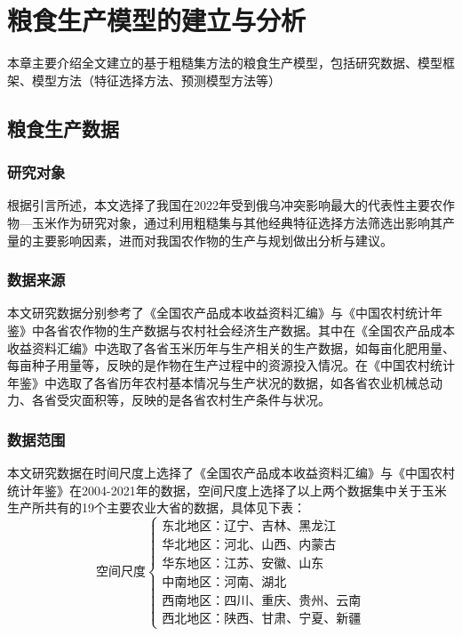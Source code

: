 
\chapter{粮食生产模型的建立与分析}

本章主要介绍全文建立的基于粗糙集方法的粮食生产模型，包括研究数据、模型框架、模型方法（特征选择方法、预测模型方法等）
\section{粮食生产数据}
\subsection{研究对象}
根据引言所述，本文选择了我国在2022年受到俄乌冲突影响最大的代表性主要农作物—玉米作为研究对象，通过利用粗糙集与其他经典特征选择方法筛选出影响其产量的主要影响因素，进而对我国农作物的生产与规划做出分析与建议。
\subsection{数据来源}
本文研究数据分别参考了《全国农产品成本收益资料汇编》与《中国农村统计年鉴》中各省农作物的生产数据与农村社会经济生产数据。其中在《全国农产品成本收益资料汇编》中选取了各省玉米历年与生产相关的生产数据，如每亩化肥用量、每亩种子用量等，反映的是作物在生产过程中的资源投入情况。在《中国农村统计年鉴》中选取了各省历年农村基本情况与生产状况的数据，如各省农业机械总动力、各省受灾面积等，反映的是各省农村生产条件与状况。
\subsection{数据范围}
本文研究数据在时间尺度上选择了《全国农产品成本收益资料汇编》与《中国农村统计年鉴》在2004-2021年的数据，空间尺度上选择了以上两个数据集中关于玉米生产所共有的19个主要农业大省的数据，具体见下表：
\[
\text{空间尺度}
\begin{cases}
\text{东北地区：辽宁、吉林、黑龙江}\\
\text{华北地区：河北、山西、内蒙古}\\
\text{华东地区：江苏、安徽、山东}\\
\text{中南地区：河南、湖北}\\
\text{西南地区：四川、重庆、贵州、云南}\\
\text{西北地区：陕西、甘肃、宁夏、新疆}
\end{cases}
\]


